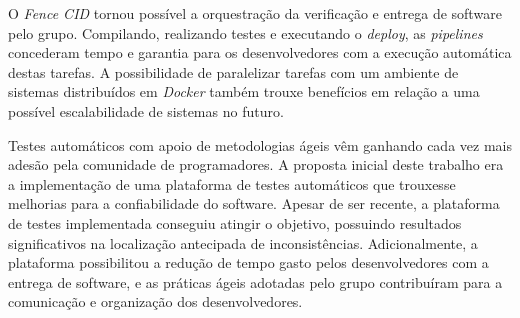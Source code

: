 O \emph{Fence CID} tornou possível a orquestração da verificação e entrega de software pelo grupo. Compilando, realizando testes e executando o \emph{deploy}, as \emph{pipelines} concederam tempo e garantia para os desenvolvedores com a execução automática destas tarefas. A possibilidade de paralelizar tarefas com um ambiente de sistemas distribuídos em \emph{Docker} também trouxe benefícios em relação a uma possível escalabilidade de sistemas no futuro.

Testes automáticos com apoio de metodologias ágeis vêm ganhando cada vez mais adesão pela comunidade de programadores. A proposta inicial deste trabalho era a implementação de uma plataforma de testes automáticos que trouxesse melhorias para a confiabilidade do software. Apesar de ser recente, a plataforma de testes implementada conseguiu atingir o objetivo, possuindo resultados significativos na localização antecipada de inconsistências. Adicionalmente, a plataforma possibilitou a redução de tempo gasto pelos desenvolvedores com a entrega de software, e as práticas ágeis adotadas pelo grupo contribuíram para a comunicação e organização dos desenvolvedores.
